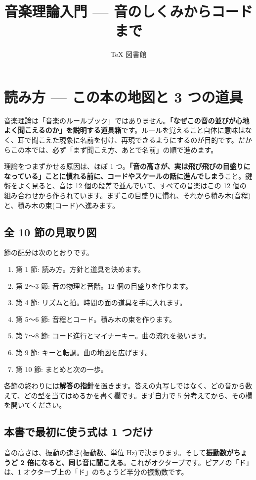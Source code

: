 \documentclass{article}
\title{音楽理論入門 — 音のしくみからコードまで}
\author{TeX 図書館}
\begin{document}
\section{読み方 — この本の地図と 3 つの道具}

音楽理論は「音楽のルールブック」ではありません。\textbf{「なぜこの音の並びが心地よく聞こえるのか」を説明する道具箱}です。ルールを覚えること自体に意味はなく、耳で聞こえた現象に名前を付け、再現できるようにするのが目的です。だからこの本では、必ず「まず聞こえ方、あとで名前」の順で進めます。

理論をつまずかせる原因は、ほぼ 1 つ。\textbf{「音の高さが、実は飛び飛びの目盛りになっている」ことに慣れる前に、コードやスケールの話に進んでしまう}こと。鍵盤をよく見ると、音は 12 個の段差で並んでいて、すべての音楽はこの 12 個の組み合わせから作られています。まずこの目盛りに慣れ、それから積み木(音程)と、積み木の束(コード)へ進みます。

\subsection{全 10 節の見取り図}

節の配分は次のとおりです。

\begin{enumerate}
\item 第 1 節: 読み方。方針と道具を決めます。
\item 第 2〜3 節: 音の物理と音階。12 個の目盛りを作ります。
\item 第 4 節: リズムと拍。時間の面の道具を手に入れます。
\item 第 5〜6 節: 音程とコード。積み木の束を作ります。
\item 第 7〜8 節: コード進行とマイナーキー。曲の流れを扱います。
\item 第 9 節: キーと転調。曲の地図を広げます。
\item 第 10 節: まとめと次の一歩。
\end{enumerate}

各節の終わりには\textbf{解答の指針}を置きます。答えの丸写しではなく、どの音から数えて、どの型を当てはめるかを書く欄です。まず自力で 5 分考えてから、その欄を開いてください。

\subsection{本書で最初に使う式は 1 つだけ}

音の高さは、振動の速さ(振動数、単位 Hz)で決まります。そして\textbf{振動数がちょうど 2 倍になると、同じ音に聞こえる}。これがオクターブです。ピアノの「ド」は、1 オクターブ上の「ド」のちょうど半分の振動数です。
\end{document}
